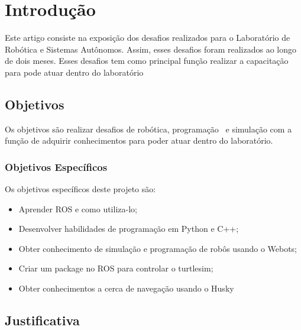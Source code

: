 \chapter{Introdução}
\label{chap:intro}

Este artigo consiste na exposição dos desafios realizados para o 
Laboratório de Robótica e Sistemas Autônomos. Assim, esses desafios foram realizados ao longo de dois meses. Esses desafios tem como principal função realizar a capacitação para pode atuar dentro do laboratório


\section{Objetivos}
\label{sec:obj}
Os objetivos são realizar desafios de robótica, programação 
e simulação com a função de adquirir conhecimentos para poder atuar dentro do laboratório.
\label{sec:obj}

\subsection{Objetivos Específicos}
\label{ssec:objesp}
Os objetivos específicos deste projeto são:
\begin{itemize}
      \item Aprender ROS e como utiliza-lo;
      \item Desenvolver habilidades de programação em Python e C++;
      \item Obter conhecimento de simulação e programação de robôs usando o Webots;
      \item Criar um package no ROS para controlar o turtlesim;
      \item Obter conhecimentos a cerca de navegação usando o Husky
  \end{itemize}



\section{Justificativa}
\label{sec:justi}

